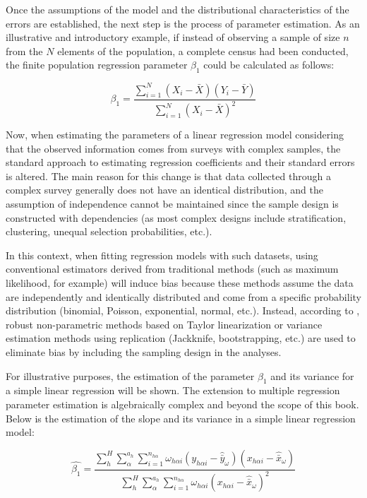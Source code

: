 \documentclass[
  12pt,
]{book}
\begin{document}
Once the assumptions of the model and the distributional characteristics of the errors are established, the next step is the process of parameter estimation. As an illustrative and introductory example, if instead of observing a sample of size \(n\) from the \(N\) elements of the population, a complete census had been conducted, the finite population regression parameter \(\beta_{1}\) could be calculated as follows:

\[
\beta_{1}  =  \frac{ \sum_{i=1}^{N}\left(X_{i}-\bar{X}\right)\left(Y_{i}-\bar{Y}\right)}{\sum_{i=1}^{N}\left(X_{i}-\bar{X}\right)^{2}}
\]

Now, when estimating the parameters of a linear regression model considering that the observed information comes from surveys with complex samples, the standard approach to estimating regression coefficients and their standard errors is altered. The main reason for this change is that data collected through a complex survey generally does not have an identical distribution, and the assumption of independence cannot be maintained since the sample design is constructed with dependencies (as most complex designs include stratification, clustering, unequal selection probabilities, etc.).

In this context, when fitting regression models with such datasets, using conventional estimators derived from traditional methods (such as maximum likelihood, for example) will induce bias because these methods assume the data are independently and identically distributed and come from a specific probability distribution (binomial, Poisson, exponential, normal, etc.). Instead, according to \citet{Wolter_2007}, robust non-parametric methods based on Taylor linearization or variance estimation methods using replication (Jackknife, bootstrapping, etc.) are used to eliminate bias by including the sampling design in the analyses.

For illustrative purposes, the estimation of the parameter \(\beta_{1}\) and its variance for a simple linear regression will be shown. The extension to multiple regression parameter estimation is algebraically complex and beyond the scope of this book. Below is the estimation of the slope and its variance in a simple linear regression model:

\[
\hat{\beta_{1}} = \frac{\sum_{h}^{H}\sum_{\alpha}^{a_{h}}\sum_{i=1}^{n_{h\alpha}}\omega_{h\alpha i}\left(y_{h\alpha i}-\hat{\bar{y}}_{\omega}\right)\left(x_{h\alpha i}-\hat{\bar{x}}_{\omega}\right)}{\sum_{h}^{H}\sum_{\alpha}^{a_{h}}\sum_{i=1}^{n_{h\alpha}}\omega_{h\alpha i}\left(x_{h\alpha i}-\hat{\bar{x}}_{\omega}\right)^{2}}
\]
\end{document}
